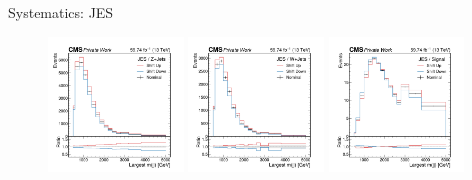 \begin{frame}[fragile]{Systematics: JES}
  	\begin{figure}[htpb]
  	  \centering
  	  \includegraphics[width=0.32\textwidth]{fig/syst/Syst-JES/Syst-JES_2018_ZJets.pdf}
  	  \includegraphics[width=0.32\textwidth]{fig/syst/Syst-JES/Syst-JES_2018_wJets.pdf}
  	  \includegraphics[width=0.32\textwidth]{fig/syst/Syst-JES/Syst-JES_2018_wz_300_5.pdf}
  	\end{figure}
\end{frame}

